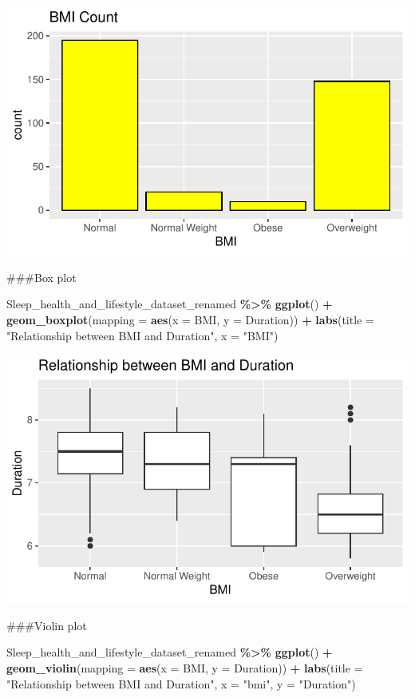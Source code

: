 \documentclass[
  11pt,
]{article}
\newenvironment{Shaded}{\begin{snugshade}}{\end{snugshade}}
\newcommand{\AttributeTok}[1]{\textcolor[rgb]{0.13,0.29,0.53}{#1}}
\newcommand{\FunctionTok}[1]{\textcolor[rgb]{0.13,0.29,0.53}{\textbf{#1}}}
\newcommand{\NormalTok}[1]{#1}
\newcommand{\SpecialCharTok}[1]{\textcolor[rgb]{0.81,0.36,0.00}{\textbf{#1}}}
\newcommand{\StringTok}[1]{\textcolor[rgb]{0.31,0.60,0.02}{#1}}
\begin{document}
\begin{center}\includegraphics[width=0.7\linewidth]{SleepHelath_files/figure-latex/unnamed-chunk-10-1} \end{center}

\#\#\#Box plot

\begin{Shaded}
\begin{Highlighting}[]
\NormalTok{Sleep\_health\_and\_lifestyle\_dataset\_renamed }\SpecialCharTok{\%\textgreater{}\%}
  \FunctionTok{ggplot}\NormalTok{() }\SpecialCharTok{+}
    \FunctionTok{geom\_boxplot}\NormalTok{(}\AttributeTok{mapping =} \FunctionTok{aes}\NormalTok{(}\AttributeTok{x =}\NormalTok{ BMI, }\AttributeTok{y =}\NormalTok{ Duration)) }\SpecialCharTok{+}
    \FunctionTok{labs}\NormalTok{(}\AttributeTok{title =} \StringTok{"Relationship between BMI and Duration"}\NormalTok{, }\AttributeTok{x =} \StringTok{"BMI"}\NormalTok{)}
\end{Highlighting}
\end{Shaded}

\begin{center}\includegraphics[width=0.7\linewidth]{SleepHelath_files/figure-latex/unnamed-chunk-11-1} \end{center}

\#\#\#Violin plot

\begin{Shaded}
\begin{Highlighting}[]
\NormalTok{Sleep\_health\_and\_lifestyle\_dataset\_renamed }\SpecialCharTok{\%\textgreater{}\%}
  \FunctionTok{ggplot}\NormalTok{() }\SpecialCharTok{+}
    \FunctionTok{geom\_violin}\NormalTok{(}\AttributeTok{mapping =} \FunctionTok{aes}\NormalTok{(}\AttributeTok{x =}\NormalTok{ BMI, }\AttributeTok{y =}\NormalTok{ Duration)) }\SpecialCharTok{+}
    \FunctionTok{labs}\NormalTok{(}\AttributeTok{title =} \StringTok{"Relationship between BMI and Duration"}\NormalTok{, }\AttributeTok{x =} \StringTok{"bmi"}\NormalTok{, }\AttributeTok{y =} \StringTok{"Duration"}\NormalTok{)}
\end{Highlighting}
\end{Shaded}
\end{document}
